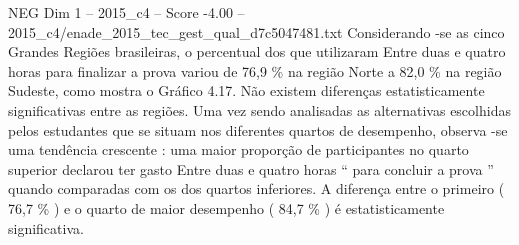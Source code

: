 \begin{textsample}{NEG Dim 1 – 2015\_c4 – Score -4.00 – 2015\_c4/enade\_2015\_tec\_gest\_qual\_d7c5047481.txt}
Considerando -se as cinco Grandes Regiões brasileiras, o percentual dos que utilizaram Entre duas e quatro horas para finalizar a prova variou de 76,9 \% na região Norte a 82,0 \% na região Sudeste, como mostra o Gráfico 4.17.
Não existem diferenças estatisticamente significativas entre as regiões.
Uma vez sendo analisadas as alternativas escolhidas pelos estudantes que se situam nos diferentes quartos de desempenho, observa -se uma tendência crescente : uma maior proporção de participantes no quarto superior declarou ter gasto Entre duas e quatro horas “ para concluir a prova ” quando comparadas com os dos quartos inferiores.
A diferença entre o primeiro ( 76,7 \% ) e o quarto de maior desempenho ( 84,7 \% ) é estatisticamente significativa.

\end{textsample}
